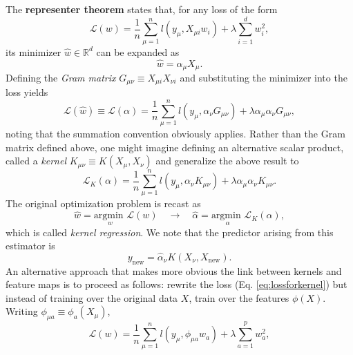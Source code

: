 \documentclass{article}
\begin{document}
\noindent The \textbf{representer theorem} states that, for any loss of the form
\begin{equation}
    \mathcal{L}(w) = \frac{1}{n}\sum_{\mu = 1}^{n} l(y_{\mu}, X_{\mu i} w_i)+\lambda \sum_{i=1}^{d} w_i^2,
    \label{eq:lossforkernel}
\end{equation}
its minimizer $\hat{w}\in \mathbb{R}^d$ can be expanded as
\begin{equation}
    \hat{w}
    = \alpha_{\mu} X_{\mu}.
\end{equation}
Defining the \emph{Gram matrix} $G_{\mu\nu} \equiv X_{\mu i}X_{\nu i}$ and substituting the minimizer into the loss yields
\begin{equation}
    \mathcal{L}(\hat{w})
    \equiv
    \mathcal{L}(\alpha)
    =
    \frac{1}{n}\sum_{\mu = 1}^{n} l(y_{\mu}, \alpha_{\nu}G_{\mu\nu})+\lambda \alpha_{\mu}\alpha_{\nu}G_{\mu\nu},
\end{equation}
noting that the summation convention obviously applies. Rather than the Gram matrix defined above, one might imagine defining an alternative scalar product, called a \emph{kernel} $K_{\mu\nu} \equiv K(X_{\mu},X_{\nu})$ and generalize the above result to
\begin{equation}
    \mathcal{L}_K(\alpha)
    =
    \frac{1}{n}\sum_{\mu = 1}^{n} l(y_{\mu}, \alpha_{\nu}K_{\mu\nu})+\lambda \alpha_{\mu}\alpha_{\nu}K_{\mu\nu}.
    \label{eq:kernelloss1}
\end{equation}
The original optimization problem is recast as
\begin{equation}
    \hat{w} = \underset{w}{\text{argmin }} \mathcal{L}(w)
    \quad\longrightarrow\quad
    \hat{\alpha} = \underset{\alpha}{\text{argmin }} \mathcal{L}_K(\alpha),
\end{equation}
which is called \emph{kernel regression}. We note that the predictor arising from this estimator is
\begin{equation}
    y_{\text{new}}
    =
    \hat{\alpha}_{\nu} K(X_{\nu},X_{\text{new}}).
\end{equation}
An alternative approach that makes more obvious the link between kernels and feature maps is to proceed as follows: rewrite the loss (Eq. \ref{eq:lossforkernel}) but instead of training over the original data $X$, train over the features $\phi(X)$. Writing $\phi_{\mu a} \equiv \phi_a(X_{\mu})$,
\begin{equation}
    \mathcal{L}(w) = \frac{1}{n}\sum_{\mu = 1}^{n} l(y_{\mu}, \phi_{\mu a} w_a)+\lambda \sum_{a=1}^{p} w_a^2,
\end{equation}
\end{document}
